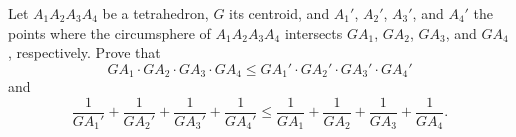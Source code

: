 Let $A_1A_2A_3A_4$ be a tetrahedron, $G$ its centroid, and $A_1'$, $A_2'$, $A_3'$, and $A_4'$ the points where the circumsphere of $A_1A_2A_3A_4$ intersects $GA_1$, $GA_2$, $GA_3$, and $GA_4$, respectively. Prove that
\[ GA_1 \cdot GA_2 \cdot GA_3 \cdot GA_4 \leq GA_1' \cdot GA_2' \cdot GA_3' \cdot GA_4' \]
and
\[ \frac{1}{GA_1'} + \frac{1}{GA_2'} + \frac{1}{GA_3'} + \frac{1}{GA_4'} \leq \frac{1}{GA_1} + \frac{1}{GA_2} + \frac{1}{GA_3} + \frac{1}{GA_4}. \]
